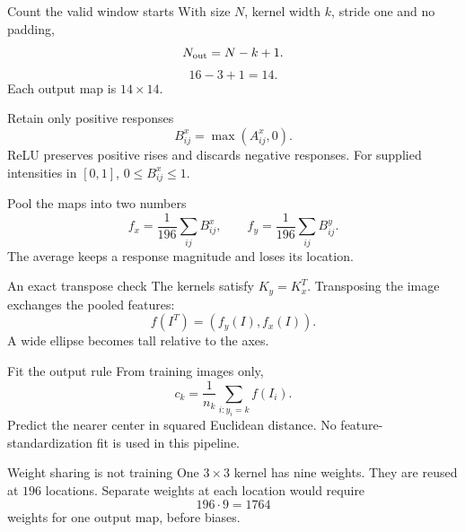 \documentclass[aspectratio=169,11pt]{beamer}
\newcommand{\notestarget}{notes.pdf}\newcommand{\noteslabel}{Notes}
\begin{document}
\renewcommand{\notestarget}{notes.pdf\#note-a-local-weighted-sum}
\begin{frame}[t,fragile,label=slide-count-the-valid-window-starts]{Count the valid window starts}
With size $N$, kernel width $k$, stride one and no padding,
\[N_{\rm out}=N-k+1.\]
\pause{}
\[16-3+1=14.\]
Each output map is $14\times14$.
\end{frame}
\renewcommand{\notestarget}{notes.pdf\#note-nonlinearity-averaging-and-information-loss}
\begin{frame}[t,fragile,label=slide-retain-only-positive-responses]{Retain only positive responses}
\[B^x_{ij}=\max(A^x_{ij},0).\]
\pause{}
ReLU preserves positive rises and discards negative responses.
For supplied intensities in $[0,1]$, $0\leq B^x_{ij}\leq1$.
\end{frame}
\renewcommand{\notestarget}{notes.pdf\#note-nonlinearity-averaging-and-information-loss}
\begin{frame}[t,fragile,label=slide-pool-the-maps-into-two-numbers]{Pool the maps into two numbers}
\[f_x=\frac1{196}\sum_{ij}B^x_{ij},\qquad
f_y=\frac1{196}\sum_{ij}B^y_{ij}.\]
\pause{}
The average keeps a response magnitude and loses its location.
\end{frame}
\renewcommand{\notestarget}{notes.pdf\#note-nonlinearity-averaging-and-information-loss}
\begin{frame}[t,fragile,label=slide-an-exact-transpose-check]{An exact transpose check}
The kernels satisfy $K_y=K_x^T$.
\pause{}
Transposing the image exchanges the pooled features:
\[\boxed{f(I^T)=(f_y(I),f_x(I))}.\]
A wide ellipse becomes tall relative to the axes.
\end{frame}
\renewcommand{\notestarget}{notes.pdf\#note-fitted-centers-and-learnable-convolutional-weights}
\begin{frame}[t,fragile,label=slide-fit-the-output-rule]{Fit the output rule}
From training images only,
\[c_k=\frac1{n_k}\sum_{i:y_i=k}f(I_i).\]
\pause{}
Predict the nearer center in squared Euclidean distance.
No feature-standardization fit is used in this pipeline.
\end{frame}
\renewcommand{\notestarget}{notes.pdf\#note-fitted-centers-and-learnable-convolutional-weights}
\begin{frame}[t,fragile,label=slide-weight-sharing-is-not-training]{Weight sharing is not training}
One $3\times3$ kernel has nine weights.
They are reused at $196$ locations.
\pause{}
Separate weights at each location would require
\[196\cdot9=1764\]
weights for one output map, before biases.
\end{frame}
\end{document}
